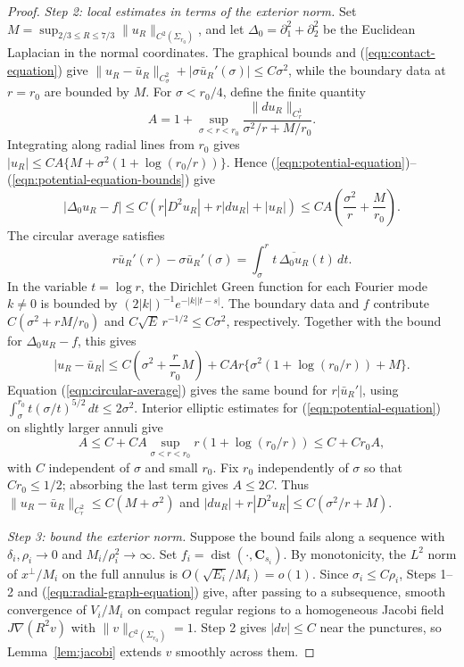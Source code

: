 \documentclass[11pt,a4paper]{article}
\numberwithin{equation}{section}
\theoremstyle{definition}
\theoremstyle{remark}
\newcommand{\dist}{\operatorname{dist}}
\begin{document}
\begin{proof}
		\smallskip
		\noindent\emph{Step 2: local estimates in terms of the exterior norm.}
		Set $M=\sup_{2/3\le R\le7/3}\|u_R\|_{C^2(\Sigma_{r_0})}$, and let
		$\Delta_0=\partial_1^2+\partial_2^2$ be the Euclidean Laplacian in the normal
		coordinates. The graphical bounds and (\ref{eqn:contact-equation}) give
		$\|u_R-\bar u_R\|_{C^2_\sigma}+|\sigma\bar u_R'(\sigma)|\le C\sigma^2$,
		while the boundary data at $r=r_0$ are bounded by $M$.
		For $\sigma<r_0/4$, define the finite quantity
		\[
		A=1+\sup_{\sigma<r<r_0}
		\frac{\|du_R\|_{C^1_r}}{\sigma^2/r+M/r_0}.
		\]
		Integrating along radial lines from $r_0$ gives
		$|u_R|\le CA\{M+\sigma^2(1+\log(r_0/r))\}$.
		Hence (\ref{eqn:potential-equation})--(\ref{eqn:potential-equation-bounds}) give
		\[
		|\Delta_0u_R-f|
		\le C(r|D^2u_R|+r|du_R|+|u_R|)
		\le CA\left(\frac{\sigma^2}{r}+\frac{M}{r_0}\right).
		\]
		The circular average satisfies
		\begin{equation}\label{eqn:circular-average}
			r\bar u_R'(r)-\sigma\bar u_R'(\sigma)
			=\int_\sigma^r t\,\overline{\Delta_0u_R}(t)\,dt.
		\end{equation}
		In the variable $t=\log r$, the Dirichlet Green function for each Fourier
		mode $k\ne0$ is bounded by
		$(2|k|)^{-1}e^{-|k||t-s|}$. The boundary data and $f$ contribute
		$C(\sigma^2+rM/r_0)$ and $C\sqrt E\,r^{-1/2}\le C\sigma^2$, respectively.
		Together with the bound for $\Delta_0u_R-f$, this gives
		\[
		|u_R-\bar u_R|
		\le C\left(\sigma^2+\frac{r}{r_0}M\right)
		+CAr\{\sigma^2(1+\log(r_0/r))+M\}.
		\]
		Equation (\ref{eqn:circular-average}) gives the same bound for $r|\bar u_R'|$, using
		$\int_\sigma^{r_0}t(\sigma/t)^{5/2}\,dt\le2\sigma^2$.
		Interior elliptic estimates for (\ref{eqn:potential-equation}) on slightly larger annuli give
		\[
		A\le C+CA\sup_{\sigma<r<r_0}r(1+\log(r_0/r))\le C+Cr_0A,
		\]
		with $C$ independent of $\sigma$ and small $r_0$.
		Fix $r_0$ independently of $\sigma$ so that $Cr_0\le1/2$; absorbing the last term gives $A\le2C$.
		Thus $\|u_R-\bar u_R\|_{C^2_r}\le C(M+\sigma^2)$ and
		$|du_R|+r|D^2u_R|\le C(\sigma^2/r+M)$.
		
		\smallskip
		\noindent\emph{Step 3: bound the exterior norm.}
		Suppose the bound fails along a sequence with $\delta_i,\rho_i\to0$ and
		$M_i/\rho_i^2\to\infty$. Set $f_i=\dist(\cdot,\mathbf C_{s_i})$.
		By monotonicity, the $L^2$ norm of $x^\perp/M_i$ on the full annulus is
		$O(\sqrt{E_i}/M_i)=o(1)$.
		Since $\sigma_i\le C\rho_i$, Steps 1--2 and
		(\ref{eqn:radial-graph-equation}) give, after passing to a subsequence,
		smooth convergence of $V_i/M_i$ on compact regular regions to a
		homogeneous Jacobi field $J\nabla(R^2v)$ with
		$\|v\|_{C^2(\Sigma_{r_0})}=1$.
		Step 2 gives $|dv|\le C$ near the punctures, so
		Lemma~\ref{lem:jacobi} extends $v$ smoothly across them.
		

\end{proof}
\end{document}

